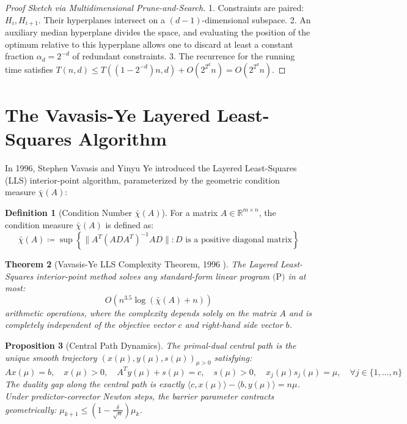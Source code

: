 \documentclass[11pt,a4paper]{article}
\newtheorem{theorem}{Theorem}[section]
\newtheorem{proposition}[theorem]{Proposition}
\theoremstyle{definition}
\newtheorem{definition}[theorem]{Definition}
\begin{document}
\begin{proof}[Proof Sketch via Multidimensional Prune-and-Search]
1. Constraints are paired: $H_i, H_{i+1}$. Their hyperplanes intersect on a $(d-1)$-dimensional subspace.
2. An auxiliary median hyperplane divides the space, and evaluating the position of the optimum relative to this hyperplane allows one to discard at least a constant fraction $\alpha_d = 2^{-d}$ of redundant constraints.
3. The recurrence for the running time satisfies $T(n, d) \le T((1 - 2^{-d})n, d) + O(2^{2^d} n) = O(2^{2^d} n)$.
\end{proof}

\section{The Vavasis-Ye Layered Least-Squares Algorithm}

In 1996, Stephen Vavasis and Yinyu Ye \cite{vavasis1996} introduced the Layered Least-Squares (LLS) interior-point algorithm, parameterized by the geometric condition measure $\bar{\chi}(A)$:

\begin{definition}[Condition Number $\bar{\chi}(A)$]\label{def:chi_bar}
For a matrix $A \in \mathbb{R}^{m \times n}$, the condition measure $\bar{\chi}(A)$ is defined as:
\begin{equation}\label{eq:chi_bar_def}
\bar{\chi}(A) \coloneqq \sup \left\{ \|A^T (A D A^T)^{-1} A D\| : D \text{ is a positive diagonal matrix} \right\}
\end{equation}
\end{definition}

\begin{theorem}[Vavasis-Ye LLS Complexity Theorem, 1996 \cite{vavasis1996}]\label{thm:vavasis_ye}
The Layered Least-Squares interior-point method solves any standard-form linear program $\text{(P)}$ in at most:
\begin{equation}\label{eq:vavasis_ye_bound}
O(n^{3.5} \log(\bar{\chi}(A) + n))
\end{equation}
arithmetic operations, where the complexity depends solely on the matrix $A$ and is completely independent of the objective vector $c$ and right-hand side vector $b$.
\end{theorem}

\begin{proposition}[Central Path Dynamics]\label{prop:central_path}
The primal-dual central path is the unique smooth trajectory $(x(\mu), y(\mu), s(\mu))_{\mu > 0}$ satisfying:
\begin{equation}\label{eq:central_path_eqs}
A x(\mu) = b, \quad x(\mu) > 0, \quad A^T y(\mu) + s(\mu) = c, \quad s(\mu) > 0, \quad x_j(\mu) s_j(\mu) = \mu, \quad \forall j \in \{1, \dots, n\}
\end{equation}
The duality gap along the central path is exactly $\langle c, x(\mu) \rangle - \langle b, y(\mu) \rangle = n \mu$.
Under predictor-corrector Newton steps, the barrier parameter contracts geometrically: $\mu_{k+1} \le (1 - \frac{\delta}{\sqrt{n}}) \mu_k$.
\end{proposition}
\end{document}
